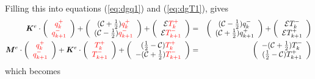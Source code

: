 Filling this into equations (\ref{eq:dgq1}) and (\ref{eq:dgT1}), gives 
\begin{eqnarray}
{\bm K}^e \cdot 
\left( 
\begin{array}{cc}
    {\color{red}q_k^+}  \\
    {\color{red}q_{k+1}^-}
\end{array}
\right)+ 
\left(
\begin{array}{cc}
     ({\cal C}+\frac{1}{2})  {\color{red}q_k^+}  \\
     ({\cal C}-\frac{1}{2})  {\color{red}q_{k+1}^-} 
\end{array}
\right)+\left(
\begin{array}{cc}
     {\cal E}    {\color{red}T_k^+}  \\
     {\cal E}    {\color{red}T_{k+1}^-} 
\end{array}
\right) 
&=& 
\left(
\begin{array}{cc}
     ({\cal C}-\frac{1}{2}) q_k^-  \\
     ({\cal C}+\frac{1}{2}) q_{k+1}^+ 
\end{array}
\right)
+ \left(
\begin{array}{cc}
     {\cal E}   T_k^-  \\
     {\cal E}   T_{k+1}^+
\end{array}
\right)  
\nonumber
\\
{\bm M}^e \cdot
\left(
\begin{array}{cc}
    {\color{red}q_k^+}  \\
    {\color{red}q_{k+1}^-}
\end{array}
\right)+
{\bm K}^e \cdot
\left(
\begin{array}{cc}
 {\color{red}T_k^+}  \\
{\color{red}T_{k+1}^-} 
\end{array}
\right) 
+ \left(
\begin{array}{cc}
     (\frac{1}{2}-{\cal C}) {\color{red}T_k^+}  \\
     -({\cal C}+\frac{1}{2}){\color{red}T_{k+1}^-} 
\end{array}
\right)
&=& \left(
\begin{array}{cc}
     -({\cal C}+\frac{1}{2})  T_k^- \\
     (\frac{1}{2}-{\cal C})  T_{k+1}^+ 
\end{array}
\right) 
\end{eqnarray}
which becomes

